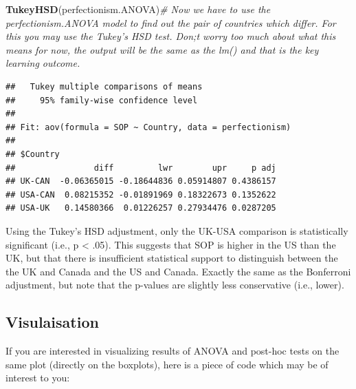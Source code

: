 \documentclass[
]{article}
\newenvironment{Shaded}{\begin{snugshade}}{\end{snugshade}}
\newcommand{\CommentTok}[1]{\textcolor[rgb]{0.56,0.35,0.01}{\textit{#1}}}
\newcommand{\FunctionTok}[1]{\textcolor[rgb]{0.13,0.29,0.53}{\textbf{#1}}}
\newcommand{\NormalTok}[1]{#1}
\begin{document}
\begin{Shaded}
\begin{Highlighting}[]
\FunctionTok{TukeyHSD}\NormalTok{(perfectionism.ANOVA)}\CommentTok{\# Now we have to use the perfectionism.ANOVA model to find out the pair of countries which differ. For this you may use the Tukey’s HSD test. Don;t worry too much about what this means for now, the output will be the same as the lm() and that is the key learning outcome.}
\end{Highlighting}
\end{Shaded}

\begin{verbatim}
##   Tukey multiple comparisons of means
##     95% family-wise confidence level
## 
## Fit: aov(formula = SOP ~ Country, data = perfectionism)
## 
## $Country
##                diff         lwr        upr     p adj
## UK-CAN  -0.06365015 -0.18644836 0.05914807 0.4386157
## USA-CAN  0.08215352 -0.01891969 0.18322673 0.1352622
## USA-UK   0.14580366  0.01226257 0.27934476 0.0287205
\end{verbatim}

Using the Tukey's HSD adjustment, only the UK-USA comparison is
statistically significant (i.e., p \textless{} .05). This suggests that
SOP is higher in the US than the UK, but that there is insufficient
statistical support to distinguish between the the UK and Canada and the
US and Canada. Exactly the same as the Bonferroni adjustment, but note
that the p-values are slightly less conservative (i.e., lower).

\subsection{Visulaisation}\label{visulaisation}

If you are interested in visualizing results of ANOVA and post-hoc tests
on the same plot (directly on the boxplots), here is a piece of code
which may be of interest to you:
\end{document}
